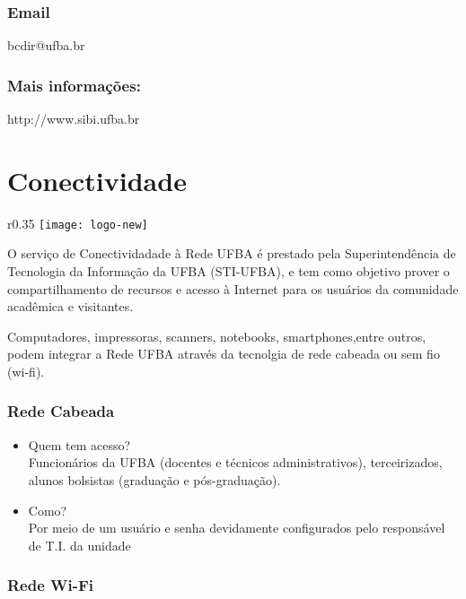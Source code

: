         \subsubsection{Email}
             bcdir@ufba.br
        \subsubsection{Mais informações:}
            http://www.sibi.ufba.br
    
\section{Conectividade}

\begin{wrapfigure}{r}{0.35\textwidth}
    \centering
    \texttt{[image: logo-new]}
\end{wrapfigure}

O serviço de Conectividadade à Rede UFBA é prestado pela Superintendência de Tecnologia da Informação da UFBA (STI-UFBA), e tem como objetivo prover o compartilhamento de recursos e acesso à Internet para os usuários da comunidade acadêmica e visitantes.

Computadores, impressoras, scanners, notebooks, smartphones,entre outros, podem integrar a Rede UFBA através da tecnolgia de rede cabeada ou sem fio (wi-fi).

    \subsubsection{Rede Cabeada}
        \begin{itemize}
            \item Quem tem acesso? \\
            Funcionários da UFBA (docentes e técnicos administrativos), terceirizados, alunos bolsistas (graduação e pós-graduação). \\
            
            \item Como?\\
            Por meio de um usuário e senha devidamente configurados pelo responsável de T.I. da unidade 
        \end{itemize}
        
    \subsubsection{Rede Wi-Fi}
        

